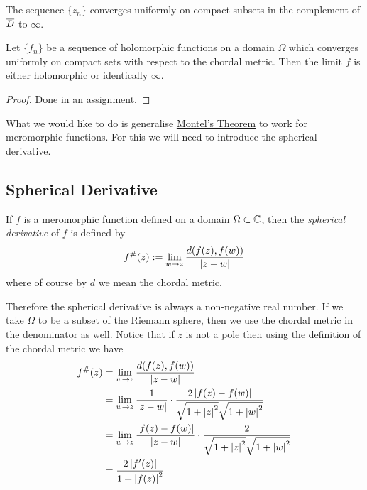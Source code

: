 \begin{example}
    The sequence $\{z_n\}$ converges uniformly on compact subsets in the complement of $\overline{D}$ to $\infty$. 
\end{example}

\begin{corollary}\label{cor:conv-holom-or-inf}
    Let $\{f_n\}$ be a sequence of holomorphic functions on a domain $\Omega$ which converges uniformly on compact sets with respect to the chordal metric. Then the limit $f$ is either holomorphic or identically $\infty$.
\end{corollary}
\begin{proof}
    Done in an assignment.
\end{proof}

What we would like to do is generalise \hyperref[thm:montel-thm]{Montel's Theorem} to work for meromorphic functions. For this we will need to introduce the spherical derivative.
\subsection{Spherical Derivative}
\begin{definition}
If $f$ is a meromorphic function defined on a domain $\Omega \subset \mathbb{C}$, then the \textit{spherical derivative} of $f$ is defined by
\begin{align*}
    f^\#(z) := \lim_{w \to z} \frac{d(f(z), f(w))}{\left|z - w\right|}
\end{align*}
where of course by $d$ we mean the chordal metric. 
\end{definition}

Therefore the spherical derivative is always a non-negative real number. If we take $\Omega$ to be a subset of the Riemann sphere, then we use the chordal metric in the denominator as well. Notice that if $z$ is not a pole then using the definition of the chordal metric we have
\begin{align*}
    f^\#(z) &= \lim_{w \to z} \frac{d(f(z), f(w))}{\left|z - w\right|}\\
    &= \lim_{w \to z} \frac{1}{\left|z - w\right|} \cdot \frac{2\left|f(z) - f(w)\right|}{\sqrt{1 + \left|z\right|^2} \sqrt{1 + \left|w\right|^2}}\\
    &= \lim_{w \to z} \frac{\left|f(z) - f(w)\right|}{\left|z - w\right|} \cdot \frac{2}{\sqrt{1 + \left|z\right|^2} \sqrt{1 + \left|w\right|^2}}\\
    &= \frac{2\left|f'(z)\right|}{1 + \left|f(z)\right|^2}
\end{align*}

